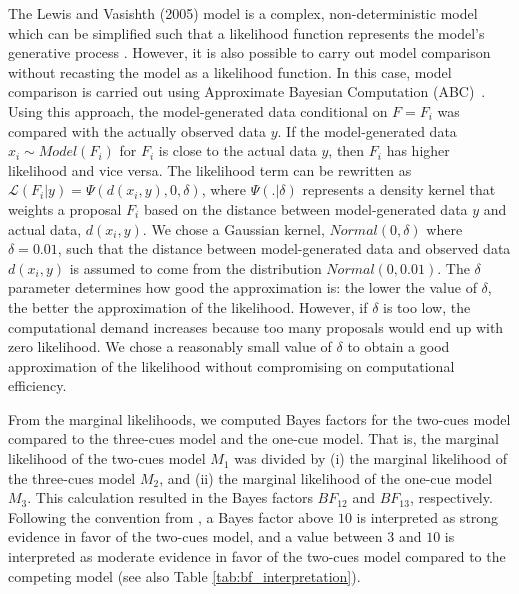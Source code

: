 \documentclass[review,preprint,12pt,authoryear,floatsintext]{elsarticle}
\begin{document}
{{The Lewis and Vasishth (2005) model is a complex, non-deterministic model which can be simplified such that a likelihood function represents the model's generative process  \citep[e.g., in][]{NicenboimRetrieval2018,lisson2020computational}. However, it is also possible to carry out model comparison without recasting the model as a likelihood function. In this case, model comparison is carried out using Approximate Bayesian Computation (ABC)~\citep{sisson2018handbook,palestro2018likelihood}. Using this approach, the model-generated data conditional on $F=F_i$ was compared with the actually observed data $y$. If the model-generated data $x_{i} \sim Model(F_i)$ for $F_i$ is close to the actual data $y$, then $F_i$ has higher likelihood and vice versa. The likelihood term can be rewritten as $\mathcal{L}(F_i|y) = \Psi(d(x_i, y), 0 , \delta)$, where $\Psi(.|\delta)$ represents a density kernel that weights a proposal $F_i$ based on the distance between model-generated data $y$ and actual data, $d(x_i,y)$. We chose a Gaussian kernel, $Normal(0,\delta)$ where $\delta=0.01$, such that the distance between model-generated data and observed data $d(x_i,y)$ is assumed to come from the distribution $Normal(0,0.01)$. The $\delta$ parameter determines how good the approximation is: the lower the value of $\delta$, the better the approximation of the likelihood. However, if $\delta$ is too low, the computational demand increases because too many proposals would end up with zero likelihood. We chose a reasonably small value of $\delta$ to obtain a good approximation of the likelihood without compromising on computational efficiency.

From the marginal likelihoods, we computed Bayes factors for the two-cues model compared to the three-cues model and the one-cue model. That is, the marginal likelihood of the two-cues model $M_1$ was divided by (i) the marginal likelihood of the three-cues model $M_2$,  and (ii) the marginal likelihood of the one-cue model $M_3$. This calculation resulted in the Bayes factors $BF_{12}$ and $BF_{13}$, respectively. Following the convention from \cite{jeffreys1998theory}, a Bayes factor above $10$ is interpreted as strong evidence in favor of the two-cues model, and a value between $3$ and $10$ is interpreted as moderate evidence in favor of the two-cues model compared to the competing model (see also Table \ref{tab:bf_interpretation}).

}}
\end{document}
